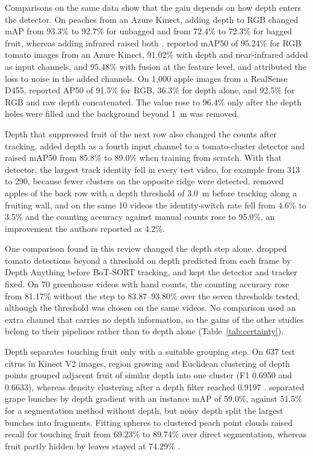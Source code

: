 Comparisons on the same data show that the gain depends on how depth enters the detector. On peaches from an Azure Kinect, adding depth to RGB changed mAP from 93.3\% to 92.7\% for unbagged and from 72.4\% to 72.3\% for bagged fruit, whereas adding infrared raised both \citep{luo2022multi}. \citet{chen2024mlp} reported mAP50 of 95.24\% for RGB tomato images from an Azure Kinect, 91.02\% with depth and near-infrared added as input channels, and 95.48\% with fusion at the feature level, and attributed the loss to noise in the added channels. On 1{,}000 apple images from a RealSense D455, \citet{kaukab2024improving} reported AP50 of 91.5\% for RGB, 36.3\% for depth alone, and 92.5\% for RGB and raw depth concatenated. The value rose to 96.4\% only after the depth holes were filled and the background beyond 1~m was removed.

Depth that suppressed fruit of the next row also changed the counts after tracking. \citet{rong2023tomato} added depth as a fourth input channel to a tomato-cluster detector and raised mAP50 from 85.8\% to 89.0\% when training from scratch. With that detector, the largest track identity fell in every test video, for example from 313 to 290, because fewer clusters on the opposite ridge were detected. \citet{wu2023ndmfcs} removed apples of the back row with a depth threshold of 3.0~m before tracking along a fruiting wall, and on the same 10 videos the identity-switch rate fell from 4.6\% to 3.5\% and the counting accuracy against manual counts rose to 95.0\%, an improvement the authors reported as 4.2\%.

One comparison found in this review changed the depth step alone. \citet{zhang2024counting} dropped tomato detections beyond a threshold on depth predicted from each frame by Depth Anything before BoT-SORT tracking, and kept the detector and tracker fixed. On 70 greenhouse videos with hand counts, the counting accuracy rose from 81.17\% without the step to 83.87--93.80\% over the seven thresholds tested, although the threshold was chosen on the same videos. No comparison used an extra channel that carries no depth information, so the gains of the other studies belong to their pipelines rather than to depth alone (Table~\ref{tab:certainty}).

Depth separates touching fruit only with a suitable grouping step. On 637 test citrus in Kinect V2 images, region growing and Euclidean clustering of depth points grouped adjacent fruit of similar depth into one cluster (F1 0.6950 and 0.6633), whereas density clustering after a depth filter reached 0.9197 \citep{lin2019field}. \citet{devanna2025boosting} separated grape bunches by depth gradient with an instance mAP of 59.0\%, against 51.5\% for a segmentation method without depth, but noisy depth split the largest bunches into fragments. Fitting spheres to clustered peach point clouds raised recall for touching fruit from 69.23\% to 89.74\% over direct segmentation, whereas fruit partly hidden by leaves stayed at 74.29\% \citep{wu2019automatic}.

